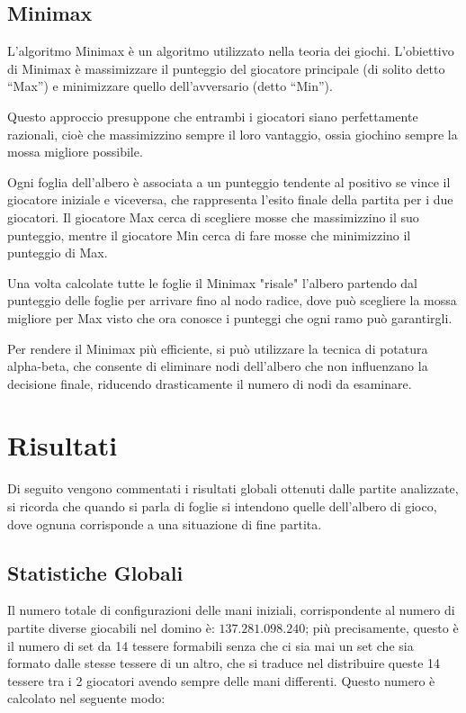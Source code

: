 \documentclass[a4paper,12pt]{report} %
\begin{document}
\section{Minimax}

L'algoritmo Minimax è un algoritmo utilizzato nella teoria dei giochi. L’obiettivo di Minimax è massimizzare il punteggio del giocatore principale (di solito detto “Max”) e minimizzare quello dell’avversario (detto “Min”). 

Questo approccio presuppone che entrambi i giocatori siano perfettamente razionali, cioè che massimizzino sempre il loro vantaggio, ossia giochino sempre la mossa migliore possibile.

Ogni foglia dell’albero è associata a un punteggio tendente al positivo se vince il giocatore iniziale e viceversa, che rappresenta l’esito finale della partita per i due giocatori. Il giocatore Max cerca di scegliere mosse che massimizzino il suo punteggio, mentre il giocatore Min cerca di fare mosse che minimizzino il punteggio di Max. 

Una volta calcolate tutte le foglie il Minimax "risale" l'albero partendo dal punteggio delle foglie per arrivare fino al nodo radice, dove può scegliere la mossa migliore per Max visto che ora conosce i punteggi che ogni ramo può garantirgli.

Per rendere il Minimax più efficiente, si può utilizzare la tecnica di potatura alpha-beta, che consente di eliminare nodi dell’albero che non influenzano la decisione finale, riducendo drasticamente il numero di nodi da esaminare. 

\chapter{Risultati}

Di seguito vengono commentati i risultati globali ottenuti dalle partite analizzate, si ricorda che quando si parla di foglie si intendono quelle dell'albero di gioco, dove ognuna corrisponde a una situazione di fine partita. 

\section{Statistiche Globali}

Il numero totale di configurazioni delle mani iniziali, corrispondente al numero di partite diverse giocabili nel domino è: \(137.281.098.240\); più precisamente, questo è il numero di set da 14 tessere formabili senza che ci sia mai un set che sia formato dalle stesse tessere di un altro, che si traduce nel distribuire queste 14 tessere tra i 2 giocatori avendo sempre delle mani differenti.
Questo numero è calcolato nel seguente modo:
\end{document}
